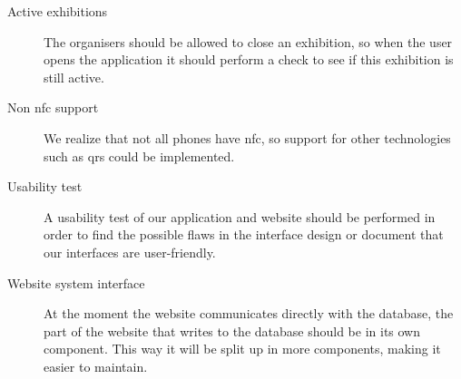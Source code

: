 \begin{description}
\item[Active exhibitions] The organisers should be allowed to close an exhibition, so when the user opens the application it should perform a check to see if this exhibition is still active.
\item[Non \ac{nfc} support] We realize that not all phones have \ac{nfc}, so support for other technologies such as \acp{qr} could be implemented.
\item[Usability test] A usability test of our application and website should be performed in order to find the possible flaws in the interface design or document that our interfaces are user-friendly.
\item[Website system interface] At the moment the website communicates directly with the database, the part of the website that writes to the database should be in its own component. This way it will be split up in more components, making it easier to maintain.
\end{description}

